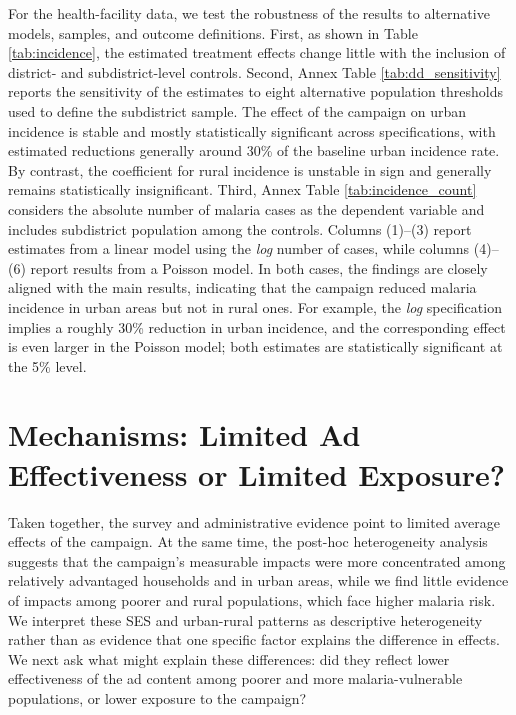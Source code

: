 For the health-facility data, we test the robustness of the results to alternative models, samples, and outcome definitions. First, as shown in Table \ref{tab:incidence}, the estimated treatment effects change little with the inclusion of district- and subdistrict-level controls. Second, Annex Table \ref{tab:dd_sensitivity} reports the sensitivity of the estimates to eight alternative population thresholds used to define the subdistrict sample. The effect of the campaign on urban incidence is stable and mostly statistically significant across specifications, with estimated reductions generally around 30\% of the baseline urban incidence rate. By contrast, the coefficient for rural incidence is unstable in sign and generally remains statistically insignificant. Third, Annex Table \ref{tab:incidence_count} considers the absolute number of malaria cases as the dependent variable and includes subdistrict population among the controls. Columns (1)--(3) report estimates from a linear model using the \textit{log} number of cases, while columns (4)--(6) report results from a Poisson model. In both cases, the findings are closely aligned with the main results, indicating that the campaign reduced malaria incidence in urban areas but not in rural ones. For example, the \textit{log} specification implies a roughly 30\% reduction in urban incidence, and the corresponding effect is even larger in the Poisson model; both estimates are statistically significant at the 5\% level.






\section{Mechanisms: Limited Ad Effectiveness or Limited Exposure?} \label{sec:mechanisms}
Taken together, the survey and administrative evidence point to limited average effects of the campaign. At the same time, the post-hoc heterogeneity analysis suggests that the campaign’s measurable impacts were more concentrated among relatively advantaged households and in urban areas, while we find little evidence of impacts among poorer and rural populations, which face higher malaria risk. We interpret these SES and urban-rural patterns as descriptive heterogeneity rather than as evidence that one specific factor explains the difference in effects. We next ask what might explain these differences: did they reflect lower effectiveness of the ad content among poorer and more malaria-vulnerable populations, or lower exposure to the campaign?

